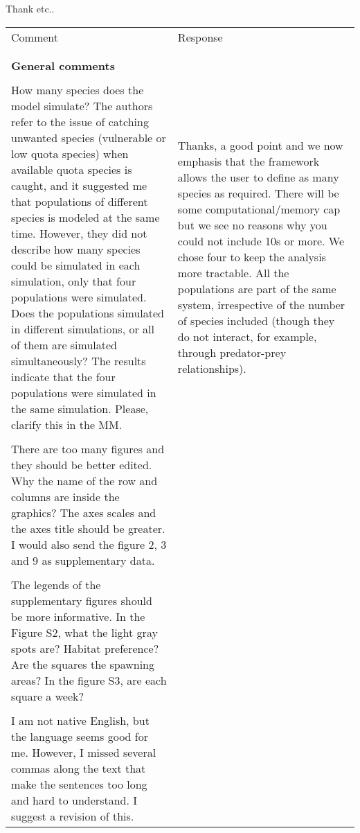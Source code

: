 \documentclass[10pt]{letter}
\begin{document}
\begin{landscape}
Thank etc..


\begin{center}

\large

	\begin{longtable}{p{12cm} | p{12cm}}
		\toprule
		Comment & Response \\
		\\
		\hline
		\\
	\textbf{General comments} &  \\
\\
		 How many species does the model simulate? The authors refer to
		 the issue of catching unwanted species (vulnerable or low
		 quota species) when available quota species is caught, and it
		 suggested me that populations of different species is modeled
		 at the same time. However, they  did not describe how many
		 species could be simulated in each simulation, only that four
		 populations were simulated. Does the populations simulated in
		 different simulations, or all of them are simulated
		 simultaneously? The results indicate that the four populations
		 were simulated in the same simulation. Please, clarify this in
		 the MM.  & Thanks, a good point and we now emphasis that the
		 framework allows the user to define as many species as
		 required. There will be some computational/memory cap but we
		 see no reasons why you could not include 10s or more. We chose
		 four to keep the analysis more tractable. All the populations
		 are part of the same system, irrespective of the number of
		 species included (though they do not interact, for example,
		 through predator-prey relationships).\\
\\
There are too many figures and they should be better edited. Why the name of
the row and columns are inside the graphics? The axes scales and the axes title
should be greater. I would also send the figure 2, 3 and 9 as supplementary
data.  & \\
\\
The legends of the supplementary figures should be more informative. In the
Figure S2, what the light gray spots are? Habitat preference? Are the squares
the spawning areas? In the figure S3, are each square a week?  & \\
\\
I am not native English, but the language seems good for me. However, I missed
several commas along the text that make the sentences too long and hard to
understand. I suggest a revision of this.  & \\


\end{longtable}
\end{center}
\end{landscape}
\end{document}
